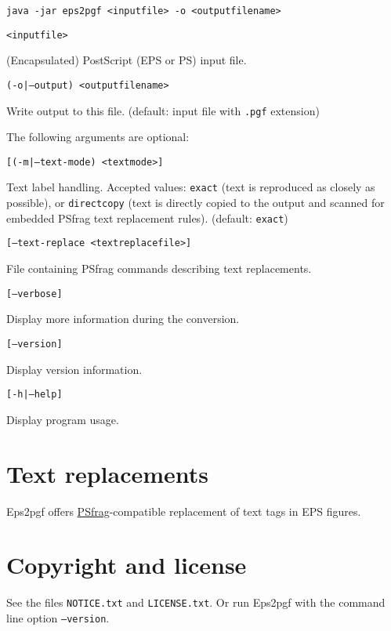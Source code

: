 \documentclass{article}
\newcommand{\cmdarg}[2]{
    \par\indent\texttt{#1}
    \smallskip
    \par\indent\indent\parbox{10.9cm}{#2}
    \medskip
}
\begin{document}
    \noindent\texttt{java -jar eps2pgf <inputfile> -o <outputfilename>}

    \medskip

    \cmdarg{<inputfile>}{(Encapsulated) PostScript (EPS or PS) input file.}

    \cmdarg{(-o|--output) <outputfilename>}{Write output to this file. (default: input file with \texttt{.pgf} extension)}

    \noindent The following arguments are optional:

    \medskip

    \cmdarg{[(-m|--text-mode) <textmode>]}{
        Text label handling. Accepted values: \texttt{exact} (text is reproduced as
        closely as possible), or \texttt{directcopy} (text is directly copied to the
        output and scanned for embedded \textsf{PSfrag} text replacement rules).
        (default: \texttt{exact})
    }

    \cmdarg{[--text-replace <textreplacefile>]}{File containing \textsf{PSfrag} commands describing text replacements.}

    \cmdarg{[--verbose]}{Display more information during the conversion.}

    \cmdarg{[--version]}{Display version information.}

    \cmdarg{[-h|--help]}{Display program usage.}


    \section{Text replacements}
    Eps2pgf offers \href{http://www.ctan.org/tex-archive/help/Catalogue/entries/psfrag.html}{\textsf{PSfrag}}-compatible replacement of text tags in EPS figures.

    \section{Copyright and license}
    See the files \texttt{NOTICE.txt} and \texttt{LICENSE.txt}. Or run Eps2pgf with the command line option \texttt{--version}.
\end{document}
